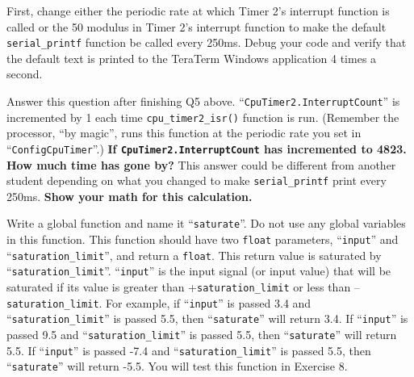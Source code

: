 \documentclass[11pt]{article}
\begin{document}
First, change either the periodic rate at which Timer 2’s interrupt function is called or the 50 modulus in Timer 2’s interrupt function to make the default \texttt{serial\_printf} function be called every 250ms. Debug your code and verify that the default text is printed to the TeraTerm Windows application 4 times a second.


Answer this question after finishing Q5 above.  “\texttt{CpuTimer2.InterruptCount}” is incremented by 1 each time \texttt{cpu\_timer2\_isr()} function is run. (Remember the processor, “by magic”, runs this function at the periodic rate you set in “\texttt{ConfigCpuTimer}”.)  \textbf{If \texttt{CpuTimer2.InterruptCount} has incremented to 4823. How much time has gone by?}  This answer could be different from another student depending on what you changed to make \texttt{serial\_printf} print every 250ms. \textbf{Show your math for this calculation.}


Write a global function and name it “\texttt{saturate}”. Do not use any global variables in this function. This function should have two \texttt{float} parameters, “\texttt{input}” and “\texttt{saturation\_limit}”, and return a \texttt{float}. This return value is saturated by “\texttt{saturation\_limit}”. “\texttt{input}” is the input signal (or input value) that will be saturated if its value is greater than +\texttt{saturation\_limit} or less than –\texttt{saturation\_limit}. For example, if “\texttt{input}” is passed 3.4 and “\texttt{saturation\_limit}” is passed 5.5, then “\texttt{saturate}” will return 3.4. If “\texttt{input}” is passed 9.5 and “\texttt{saturation\_limit}” is passed 5.5, then “\texttt{saturate}” will return 5.5. If “\texttt{input}” is passed -7.4 and “\texttt{saturation\_limit}” is passed 5.5, then “\texttt{saturate}” will return -5.5. You will test this function in Exercise 8.

\end{document}
